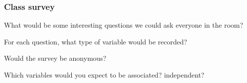 

\begin{frame}
\frametitle{Class survey}
What would be some interesting questions we could ask everyone in the room?

For each question, what type of variable would be recorded?

Would the survey be anonymous?

Which variables would you expect to be associated? independent?

\end{frame}


